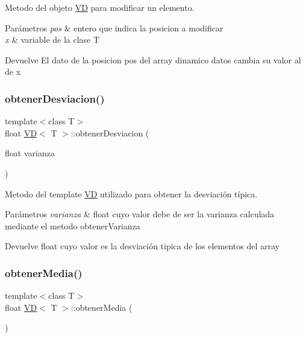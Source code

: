 Metodo del objeto \hyperlink{classVD}{VD} para modificar un elemento. 


\begin{DoxyParams}{Parámetros}
{\em pos} & entero que indica la posicion a modificar \\
\hline
{\em x} & variable de la clase T \\
\hline
\end{DoxyParams}
\begin{DoxyReturn}{Devuelve}
El dato de la posicion pos del array dinamico datos cambia su valor al de x 
\end{DoxyReturn}
\mbox{\label{classVD_a65a0f383bce59447393168d183c8a945}} 
\subsubsection{\texorpdfstring{obtener\+Desviacion()}{obtenerDesviacion()}}
{\footnotesize\ttfamily template$<$class T$>$ \\
float \hyperlink{classVD}{VD}$<$ T $>$\+::obtener\+Desviacion (\begin{DoxyParamCaption}\item[{float}]{varianza }\end{DoxyParamCaption})\hspace{0.3cm}{\ttfamily [inline]}}



Metodo del template \hyperlink{classVD}{VD} utilizado para obtener la desviación típica. 


\begin{DoxyParams}{Parámetros}
{\em varianza} & float cuyo valor debe de ser la varianza calculada mediante el metodo obtener\+Varianza \\
\hline
\end{DoxyParams}
\begin{DoxyReturn}{Devuelve}
float cuyo valor es la desviación tipica de los elementos del array 
\end{DoxyReturn}
\mbox{\label{classVD_aa480a2e4480402b23d9ae83fd1cf661e}} 
\subsubsection{\texorpdfstring{obtener\+Media()}{obtenerMedia()}}
{\footnotesize\ttfamily template$<$class T$>$ \\
float \hyperlink{classVD}{VD}$<$ T $>$\+::obtener\+Media (\begin{DoxyParamCaption}{ }\end{DoxyParamCaption})\hspace{0.3cm}{\ttfamily [inline]}}



